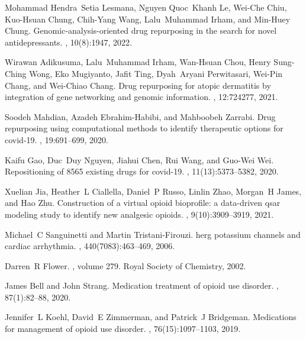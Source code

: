 \documentclass[10pt]{article}
\begin{document}
\begin{thebibliography}{10}
			Mohammad Hendra~Setia Lesmana, Nguyen Quoc~Khanh Le, Wei-Che Chiu, Kuo-Hsuan
			Chung, Chih-Yang Wang, Lalu~Muhammad Irham, and Min-Huey Chung.
			\newblock Genomic-analysis-oriented drug repurposing in the search for novel
			antidepressants.
			, 10(8):1947, 2022.
			
			Wirawan Adikusuma, Lalu~Muhammad Irham, Wan-Hsuan Chou, Henry Sung-Ching Wong,
			Eko Mugiyanto, Jafit Ting, Dyah~Aryani Perwitasari, Wei-Pin Chang, and
			Wei-Chiao Chang.
			\newblock Drug repurposing for atopic dermatitis by integration of gene
			networking and genomic information.
			, 12:724277, 2021.
			
			Soodeh Mahdian, Azadeh Ebrahim-Habibi, and Mahboobeh Zarrabi.
			\newblock Drug repurposing using computational methods to identify therapeutic
			options for covid-19.
			, 19:691--699, 2020.
			
			Kaifu Gao, Duc~Duy Nguyen, Jiahui Chen, Rui Wang, and Guo-Wei Wei.
			\newblock Repositioning of 8565 existing drugs for covid-19.
			, 11(13):5373--5382,
			2020.
			
			Xuelian Jia, Heather~L Ciallella, Daniel~P Russo, Linlin Zhao, Morgan~H James,
			and Hao Zhu.
			\newblock Construction of a virtual opioid bioprofile: a data-driven qsar
			modeling study to identify new analgesic opioids.
			, 9(10):3909--3919,
			2021.
			
			Michael~C Sanguinetti and Martin Tristani-Firouzi.
			\newblock herg potassium channels and cardiac arrhythmia.
			, 440(7083):463--469, 2006.
			
			Darren~R Flower.
			, volume 279.
			\newblock Royal Society of Chemistry, 2002.
			
			James Bell and John Strang.
			\newblock Medication treatment of opioid use disorder.
			, 87(1):82--88, 2020.
			
			Jennifer~L Koehl, David~E Zimmerman, and Patrick~J Bridgeman.
			\newblock Medications for management of opioid use disorder.
			, 76(15):1097--1103,
			2019.
			

\end{thebibliography}
\end{document}
